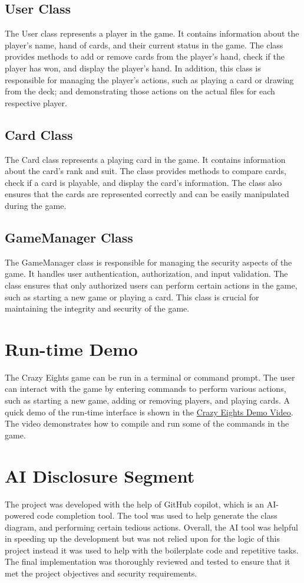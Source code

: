 \documentclass[conference]{IEEEtran}
\begin{document}
\subsection{User Class}
The User class represents a player in the game. It contains information about the player's name, hand of cards, and their current status in the game. The class provides methods to add or remove cards from the player's hand, check if the player has won, and display the player's hand. In addition, this class is responsible for managing the player's actions, such as playing a card or drawing from the deck; and demonstrating those actions on the actual files for each respective player.

\subsection{Card Class}
The Card class represents a playing card in the game. It contains information about the card's rank and suit. The class provides methods to compare cards, check if a card is playable, and display the card's information. The class also ensures that the cards are represented correctly and can be easily manipulated during the game.

\subsection{GameManager Class}
The GameManager class is responsible for managing the security aspects of the game. It handles user authentication, authorization, and input validation. The class ensures that only authorized users can perform certain actions in the game, such as starting a new game or playing a card. This class is crucial for maintaining the integrity and security of the game.

\section{Run-time Demo}
The Crazy Eights game can be run in a terminal or command prompt. The user can interact with the game by entering commands to perform various actions, such as starting a new game, adding or removing players, and playing cards. A quick demo of the run-time interface is shown in the \href{https://youtu.be/vTJYHRKo5vw}{Crazy Eights Demo Video}. The video demonstrates how to compile and run some of the commands in the game.

\section{AI Disclosure Segment}
The project was developed with the help of GitHub copilot, which is an AI-powered code completion tool. The tool was used to help generate  the class diagram, and performing certain tedious actions. Overall, the AI tool was helpful in speeding up the development but was not relied upon for the logic of this project instead it was used to help with the boilerplate code and repetitive tasks. The final implementation was thoroughly reviewed and tested to ensure that it met the project objectives and security requirements.
\end{document}
